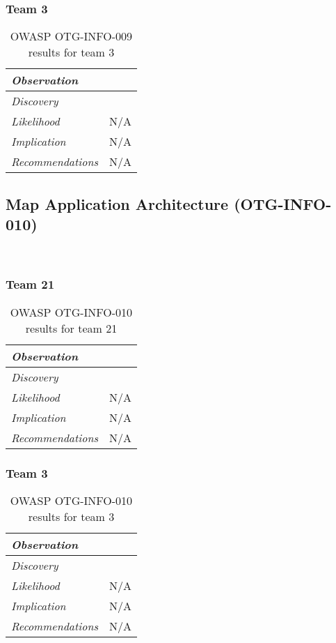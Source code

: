 \documentclass[headsepline,footsepline,footinclude=false,oneside,fontsize=11pt,paper=a4,listof=totoc,bibliography=totoc]{scrbook} %
\begin{document}
\subsubsection{Team 3}

\begin{table}[H]
\centering
 \begin{tabular}{l p{11cm}} 
 \textit{Observation} & \\ 
 \hline
 \textit{Discovery} &  \\
 \hline
 \textit{Likelihood} & N/A\\
 \hline
 \textit{Implication} & N/A\\
 \hline
 \textit{Recommendations} & N/A\\ 
\end{tabular}
\caption{OWASP OTG-INFO-009 results for team 3}
\label{table:scenario2}
\end{table}

\pagebreak 

\subsection{Map Application Architecture (OTG-INFO-010)}\

\subsubsection{Team 21}

\begin{table}[H]
\centering
 \begin{tabular}{l p{11cm}} 
 \textit{Observation} & \\ 
 \hline
 \textit{Discovery} &  \\
 \hline
 \textit{Likelihood} & N/A\\
 \hline
 \textit{Implication} & N/A\\
 \hline
 \textit{Recommendations} & N/A\\ 
\end{tabular}
\caption{OWASP OTG-INFO-010 results for team 21}
\label{table:scenario2}
\end{table}

\subsubsection{Team 3}

\begin{table}[H]
\centering
 \begin{tabular}{l p{11cm}} 
 \textit{Observation} & \\ 
 \hline
 \textit{Discovery} &  \\
 \hline
 \textit{Likelihood} & N/A\\
 \hline
 \textit{Implication} & N/A\\
 \hline
 \textit{Recommendations} & N/A\\ 
\end{tabular}
\caption{OWASP OTG-INFO-010 results for team 3}
\label{table:scenario2}
\end{table}
\end{document}
